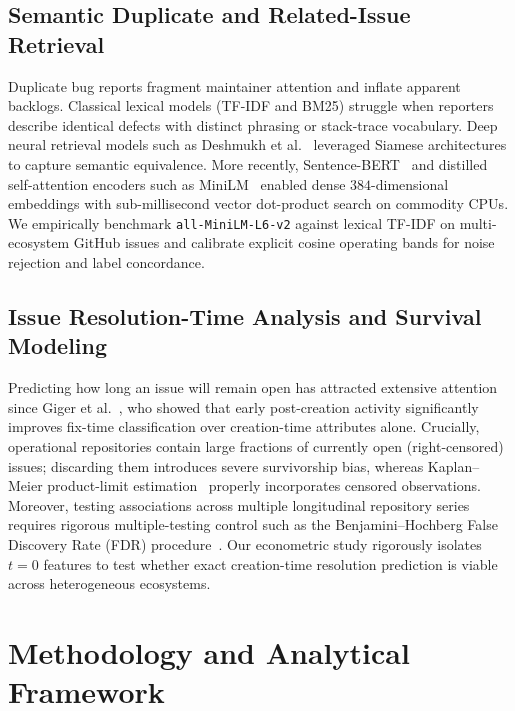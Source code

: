 \documentclass[conference]{IEEEtran}
\begin{document}
\subsection{Semantic Duplicate and Related-Issue Retrieval}
Duplicate bug reports fragment maintainer attention and inflate apparent backlogs. Classical lexical models (TF-IDF and BM25) struggle when reporters describe identical defects with distinct phrasing or stack-trace vocabulary. Deep neural retrieval models such as Deshmukh et al.~\cite{deshmukh2017duplicate} leveraged Siamese architectures to capture semantic equivalence. More recently, Sentence-BERT~\cite{reimers2019sentence} and distilled self-attention encoders such as MiniLM~\cite{wang2020minilm} enabled dense $384$-dimensional embeddings with sub-millisecond vector dot-product search on commodity CPUs. We empirically benchmark \texttt{all-MiniLM-L6-v2} against lexical TF-IDF on multi-ecosystem GitHub issues and calibrate explicit cosine operating bands for noise rejection and label concordance.

\subsection{Issue Resolution-Time Analysis and Survival Modeling}
Predicting how long an issue will remain open has attracted extensive attention since Giger et al.~\cite{giger2010predicting}, who showed that early post-creation activity significantly improves fix-time classification over creation-time attributes alone. Crucially, operational repositories contain large fractions of currently open (right-censored) issues; discarding them introduces severe survivorship bias, whereas Kaplan--Meier product-limit estimation~\cite{kaplan1958nonparametric} properly incorporates censored observations. Moreover, testing associations across multiple longitudinal repository series requires rigorous multiple-testing control such as the Benjamini--Hochberg False Discovery Rate (FDR) procedure~\cite{benjamini1995controlling}. Our econometric study rigorously isolates $t=0$ features to test whether exact creation-time resolution prediction is viable across heterogeneous ecosystems.

\section{Methodology and Analytical Framework}
\label{sec:methodology}
\end{document}
